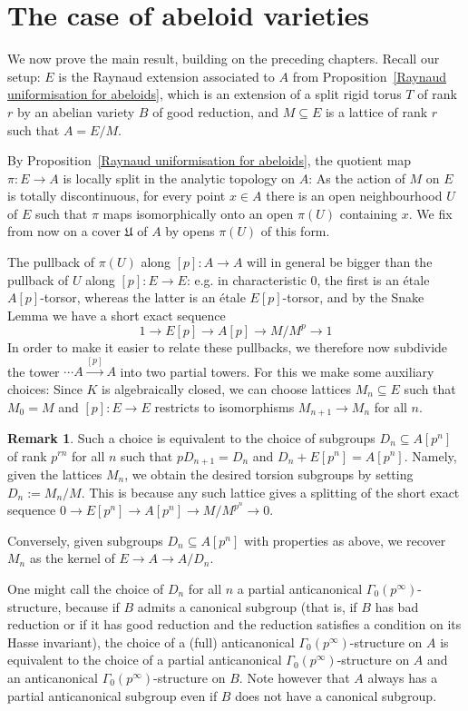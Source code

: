 \documentclass[10pt,oneside]{amsart}
\theoremstyle{definition}
\newtheorem{remark}[theorem]{Remark}
\begin{document}
	\section{The case of abeloid varieties}\label{The case of abeloid varieties}
	We now prove the main result, building on the preceding chapters. Recall our setup: $E$ is the Raynaud extension associated to $A$ from Proposition~\ref{Raynaud uniformisation for abeloids}, which is an extension of a split rigid torus $T$ of rank $r$ by an abelian variety $B$ of good reduction, and $M\subseteq E$  is a lattice of rank $r$ such that $A=E/M$. 

By Proposition~\ref{Raynaud uniformisation for abeloids}, the quotient map $\pi:E\to A$ is locally split in the analytic topology on $A$: As the action of $M$ on $E$ is totally discontinuous, for every point  $x\in A$ there is an open neighbourhood $U$ of $E$ such that $\pi$ maps isomorphically onto an open $\pi(U)$ containing $x$. We fix from now on a cover $\mathfrak U$ of $A$ by opens $\pi(U)$ of this form.

The pullback of $\pi(U)$ along $[p]:A\to A$ will in general be bigger than the pullback of $U$ along $[p]:E\to E$: e.g. in characteristic 0, the first is an \'etale $A[p]$-torsor, whereas  the latter is an \'etale $E[p]$-torsor, and by the Snake Lemma we have a short exact sequence
\[1\to E[p]\to A[p]\to M/M^p\to 1\]
In order to make it easier to relate these pullbacks, we therefore now subdivide the tower $\cdots A\xrightarrow{[p]}A$ into two partial towers. For this we make some auxiliary choices: Since $K$ is algebraically closed, we can choose lattices $M_n\subseteq E$ such that $M_0=M$ and $[p]:E\rightarrow E$ restricts to isomorphisms $M_{n+1}\rightarrow M_n$ for all $n$.
	
	\begin{remark}\label{remark: Definition of the D_n}
		Such a choice is equivalent to the choice of subgroups $D_n\subseteq A[p^n]$ of rank $p^{rn}$ for all $n$ such that $pD_{n+1}=D_n$ and $D_n+E[p^n]=A[p^n]$. Namely,
		given the lattices $M_{n}$, we obtain the desired torsion subgroups by setting $D_n:=M_{n}/M$. This is because any such lattice gives a splitting of the short exact sequence $0\rightarrow E[p^n]\rightarrow A[p^n]\rightarrow M/M^{p^n} \rightarrow 0$.
		
		Conversely, given subgroups $D_n\subseteq A[p^n]$ with properties as above, we recover $M_n$ as the kernel of $E\rightarrow A\rightarrow A/D_n$.
		
		One might call the choice of $D_n$ for all $n$ a partial anticanonical $\Gamma_0(p^\infty)$-structure, because if $B$ admits a canonical subgroup (that is, if $B$ has bad reduction or if it has good reduction and the reduction satisfies a condition on its Hasse invariant), the choice of a (full) anticanonical $\Gamma_0(p^\infty)$-structure on $A$ is equivalent to the choice of a partial anticanonical $\Gamma_0(p^\infty)$-structure on $A$ and an anticanonical $\Gamma_0(p^\infty)$-structure on $B$. Note however that $A$ always has a partial anticanonical subgroup even if $B$ does not have a canonical subgroup.
	\end{remark}
	
\end{document}
